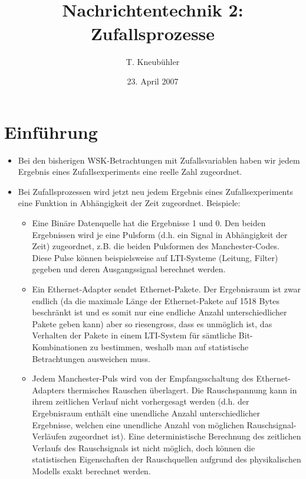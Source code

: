 \documentclass[10pt, a4paper]{article}
\title{\vspace*{-4cm}\psfig{figure=elektrotechnik_sw.eps,width=6cm}
       \hfill \textit{ }\psfig{figure=ICOM_Logo_gray.eps,width=3.5cm}
                     \\[1cm]
              Nachrichtentechnik 2: Zufallsprozesse}
\author{T. Kneub\"uhler}
\date{23. April 2007}
\begin{document}
\maketitle
\noindent
\vspace*{-15mm}


\section{Einf\"uhrung}
\begin{itemize}
  \item Bei den bisherigen WSK-Betrachtungen mit Zufallsvariablen haben wir 
        jedem Ergebnis eines Zufallsexperiments eine reelle Zahl zugeordnet.
  \item Bei Zufallsprozessen wird jetzt neu jedem Ergebnis eines Zufallsexperiments
        eine Funktion in Ab\-h\"angig\-keit der Zeit zugeordnet.
        Beispiele:
  \begin{itemize}
    \item Eine Bin\"are Datenquelle hat die Ergebnisse 1 und 0. Den beiden Ergebnissen wird
          je eine Pulsform (d.h. ein Signal in Abh\"angigkeit der Zeit) zugeordnet, 
          z.B. die beiden Pulsformen des Manchester-Codes.
          Diese Pulse k\"onnen beispielsweise auf LTI-Systeme (Leitung, Filter) 
          gegeben und deren Ausgangssignal berechnet werden.          
    \item Ein Ethernet-Adapter sendet Ethernet-Pakete. Der Ergebnisraum ist zwar endlich
          (da die maximale L\"ange der Ethernet-Pakete auf 1518 Bytes beschr\"ankt ist und es somit
          nur eine endliche Anzahl unterschiedlicher Pakete geben kann)
          aber so riesengross, dass es unm\"oglich ist, das Verhalten der Pakete in einem LTI-System 
          f\"ur s\"amtliche Bit-Kombinationen zu bestimmen, weshalb man auf 
          statistische Betrachtungen ausweichen muss.
    \item Jedem Manchester-Puls wird von der Empfangsschaltung des Ethernet-Adapters 
          thermisches Rauschen \"uberlagert. Die Rauschspannung kann
          in ihrem zeitlichen Verlauf nicht vorhergesagt werden (d.h. der Ergebnisraum enth\"alt eine
          unendliche Anzahl unterschiedlicher Ergebnisse, welchen eine unendliche Anzahl von
          m\"oglichen Rauschsignal-Verl\"aufen zugeordnet ist).
          Eine deterministische Berechnung des zeitlichen Verlaufs des Rauschsignals ist nicht
          m\"oglich, doch k\"onnen die statistischen Eigenschaften der Rauschquellen 
          aufgrund des physikalischen Modells exakt berechnet werden.
  \end{itemize} 
\end{itemize} 
\end{document}
